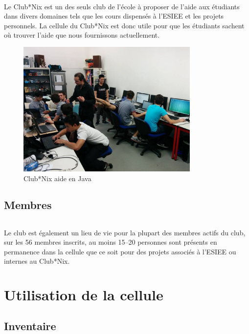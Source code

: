 \documentclass[11pt]{report}
\begin{document}
\paragraph{} Le Club*Nix est un des seuls club de l'école à proposer de l'aide
aux étudiants dans divers domaines tels que les cours dispensés à l'ESIEE et
les projets personnels. La cellule du Club*Nix est donc utile pour que les
étudiants sachent où trouver l'aide que nous fournissons actuellement.


\begin{figure}[h!]
  \caption{Club*Nix aide en Java}
  \centering
	\includegraphics[width=90mm]{res/java-tutoring.jpg}
\end{figure}

\chapter{Membres}

\paragraph{} Le club est également un lieu de vie pour la plupart des membres
actifs du club, sur les 56 membres inscrits, au moins 15--20 personnes sont
présents en permanence dans la cellule que ce soit pour des projets 
associés à l'ESIEE ou internes au Club*Nix.


\part{Utilisation de la cellule}

\chapter{Inventaire}
\end{document}
